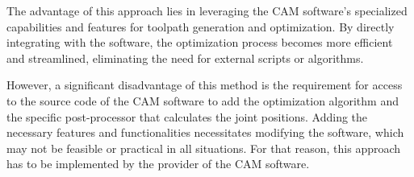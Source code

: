 The advantage of this approach lies in leveraging the \acrshort{CAM} software's specialized capabilities and features for toolpath generation and optimization. By directly integrating with the software, the optimization process becomes more efficient and streamlined, eliminating the need for external scripts or algorithms.

However, a significant disadvantage of this method is the requirement for access to the source code of the \acrshort{CAM} software to add the optimization algorithm and the specific post-processor that calculates the joint positions. Adding the necessary features and functionalities necessitates modifying the software, which may not be feasible or practical in all situations. For that reason, this approach has to be implemented by the provider of the \acrshort{CAM} software. 